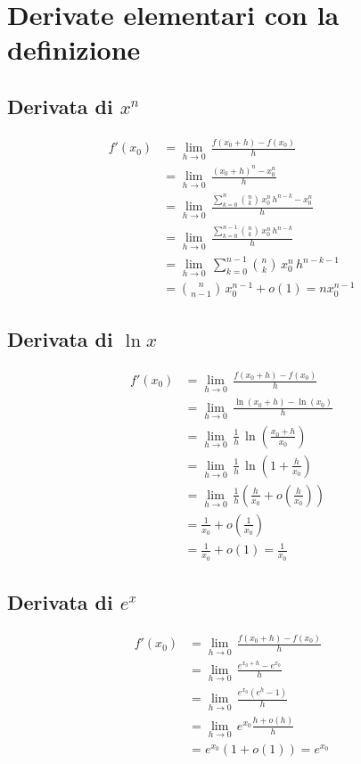 \documentclass[../../dimostrazioni]{subfiles}
\begin{document}
    \chapter{Derivate elementari con la definizione}

        \section*{Derivata di \(x^n\)}
            \begin{align*}
                f'(x_0) &= \lim_{h \to 0} \, \frac{f(x_0 + h) - f(x_0)}{h}\\
                &= \lim_{h \to 0} \, \frac{{(x_0 + h)}^n - x_0^n}{h}\\
                &= \lim_{h \to 0} \, \frac{\sum_{k = 0}^n \binom{n}{k} \, x_0^n \, h^{n - k} - x_0^n}{h}\\
                &= \lim_{h \to 0} \, \frac{\sum_{k = 0}^{n - 1} \binom{n}{k} \, x_0^n \, h^{n - k}}{h}\\
                &= \lim_{h \to 0} \, \sum_{k = 0}^{n - 1} \binom{n}{k} \, x_0^n \, h^{n - k - 1}\\
                &= \binom{n}{n - 1} \, x_0^{n - 1} + o(1) = n x_0^{n - 1}
            \end{align*}
            
        \section*{Derivata di \(\ln x\)}
            \begin{align*}
                f'(x_0) &= \lim_{h \to 0} \, \frac{f(x_0 + h) - f(x_0)}{h}\\
                &= \lim_{h \to 0} \, \frac{\ln(x_0 + h) - \ln(x_0)}{h}\\
                &= \lim_{h \to 0} \, \frac{1}{h} \, \ln \left(\frac{x_0 + h}{x_0}\right)\\
                &= \lim_{h \to 0} \, \frac{1}{h} \, \ln \left(1 + \frac{h}{x_0}\right)\\
                &= \lim_{h \to 0} \, \frac{1}{h} \left(\frac{h}{x_0} + o\!\left(\frac{h}{x_0}\right)\right)\\
                &= \frac{1}{x_0} + o\!\left(\frac{1}{x_0}\right)\\
                &= \frac{1}{x_0} + o(1) = \frac{1}{x_0}
            \end{align*}

        \section*{Derivata di \(e^x\)}
            \begin{align*}
                f'(x_0) &= \lim_{h \to 0} \, \frac{f(x_0 + h) - f(x_0)}{h}\\
                &= \lim_{h \to 0} \, \frac{e^{x_0 + h} - e^{x_0}}{h}\\
                &= \lim_{h \to 0} \, \frac{e^{x_0} (e^h - 1)}{h}\\
                &= \lim_{h \to 0} \, e^{x_0} \frac{h + o(h)}{h}\\
                &= e^{x_0} (1 + o(1)) = e^{x_0}
            \end{align*}
\end{document}
